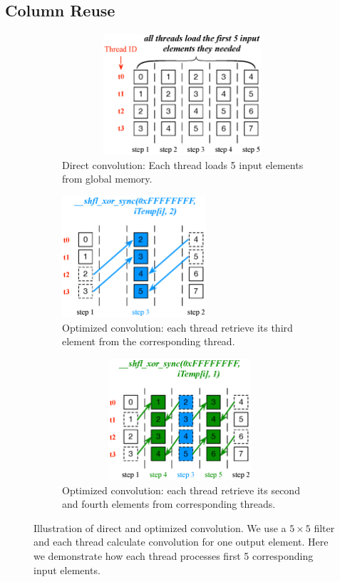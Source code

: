 \documentclass[sigplan,review,anonymous]{acmart}\settopmatter{printfolios=true,printccs=false,printacmref=false}
\begin{document}
\subsection{Column Reuse}
\begin{figure}
	\begin{subfigure}{0.33\textwidth}
		\centering
		\captionsetup{width=0.9\textwidth}
		 \includegraphics[width=0.98\textwidth,height=4.5cm]{./figure/directconv.eps}
		 \caption{Direct convolution: Each thread loads 5 input elements from global memory.}
		 \label{fig:directalgo}
	\end{subfigure}
	\begin{subfigure}{0.3\textwidth}
		\centering
		\captionsetup{width=0.9\textwidth}
		 \includegraphics[width=\textwidth,height=4.5cm]{./figure/optalgo1.eps}
		 \caption{Optimized convolution: each thread retrieve its third element from the corresponding thread.}
		 \label{fig:optalgo1}
	\end{subfigure}
	\begin{subfigure}{0.3\textwidth}
		\centering
		\captionsetup{width=0.9\textwidth}

		 \includegraphics[width=0.96\textwidth,height=4.5cm]{./figure/optalgo2.eps}
		 \caption{Optimized convolution: each thread retrieve its second and fourth elements from corresponding threads.}
		 \label{fig:optalgo2}
	\end{subfigure}
  \caption{Illustration of direct and optimized convolution. We use a $5 \times 5$ filter  and each thread calculate convolution for one output element. Here we demonstrate how each thread processes first 5 corresponding input elements.}
   \label{fig:corealgo}
\end{figure}
\end{document}
